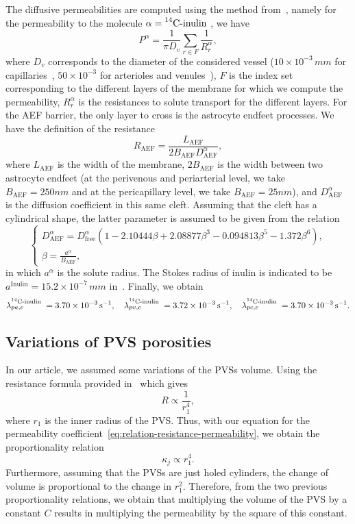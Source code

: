 \documentclass[a4paper,11pt]{article}
\newcommand{\AP}[1]{\textcolor{blue}{AP: #1}}
\newcommand{\1}{^{(1)}}
\newcommand{\2}{^{(2)}}
\newcommand{\Cinulin}{$\prescript{14}{}{\text{C}}$-inulin }
\begin{document}
The diffusive permeabilities are computed using the method from~\cite{li-2010-BBB}, namely for the permeability to the molecule $\alpha = \text{\Cinulin}$, we have
\[
    P^\alpha = \frac{1}{\pi D_v} \sum_{r \in F} \frac{1}{R_r^\alpha}, 
\]
where $D_v$ corresponds to the diameter of the considered vessel ($10\times 10^{-3}\, \si{mm}$ for capillaries~\cite{farkas-diam-capillaries}, $50\times 10^{-3}$ for arterioles and venules~\cite{Al-arterial-diam,Nguyen-venule-diam}), $F$ is the index set corresponding to the different layers of the membrane for which we compute the permeability, $R_r^\alpha$ is the resistances to solute transport for the different layers. 
For the AEF barrier, the only layer to cross is the astrocyte endfeet processes. We have the definition of the resistance 
\[
    R_\text{AEF}= \frac{L_\text{AEF}}{2 B_\text{AEF} D^\alpha_\text{AEF}},
\]
where $L_\text{AEF}$ is the width of the membrane, $2 B_\text{AEF}$ is the width between two astrocyte endfeet (at the perivenous and periarterial level, we take $B_\text{AEF} = 250 \si{nm}$ and at the pericapillary level, we take $B_\text{AEF} = 25 \si{nm}$), and $ D^\alpha_\text{AEF}$ is the diffusion coefficient in this same cleft. 
Assuming that the cleft has a cylindrical shape, the latter parameter is assumed to be given from the relation~\cite{Michel-1999-permeablity} 
\[
\begin{cases}
D^\alpha_\text{AEF} = D^\alpha_\text{free}\left(1-2.10444\beta +2.08877\beta^3 - 0.094813\beta^5 - 1.372\beta^6 \right),\\
\beta = \frac{a^\alpha}{B_\text{AEF}},
\end{cases}
\]
in which $a^\alpha$ is the solute radius. The Stokes radius of inulin is indicated to be $a^\text{Inulin} = 15.2\times 10^{-7} \, \si{mm}$ in~\cite{Schultz-hydro-radii-1961}.
Finally, we obtain 
\[
        \lambda_{pa,e}^\text{\Cinulin} = 3.70\times 10^{-3}\,\si{\second^{-1}}, \quad \lambda_{pv,e}^\text{\Cinulin} = 3.72 \times 10^{-3}\,\si{\second^{-1}},\quad  \lambda_{pc,e}^\text{\Cinulin} = 3.70\times 10^{-3}\,\si{\second^{-1}} .  
\]

\subsection{Variations of PVS porosities}

In our article, we assumed some variations of the PVSs volume. Using the resistance formula provided in~\cite{Vinje-2020-ICP} which gives 
\[
R \propto \frac{1}{r_1^4},
\]
where $r_1$ is the inner radius of the PVS.  
Thus, with our equation for the permeability coefficient~\eqref{eq:relation-resistance-permeability}, we obtain the proportionality relation 
\[
\kappa_j \propto r_1^4.
\]
Furthermore, assuming that the PVSs are just holed cylinders, the change of volume is proportional to the change in $r_1^2$. 
Therefore, from the two previous proportionality relations, we obtain that multiplying the volume of the PVS by a constant $C$ results in multiplying the permeability by the square of this constant.  
\end{document}
